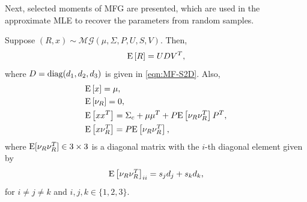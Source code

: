 Next, selected moments of MFG are presented, which are used in the approximate MLE to recover the parameters from random samples.
\begin{theorem} \label{thm:MFG-moment}
	Suppose $(R,x)\sim\mathcal{MG}(\mu,\allowbreak \Sigma,\allowbreak P,\allowbreak U,\allowbreak S,\allowbreak V)$.
	Then,
	\begin{equation} \label{eqn:MFG-ER}
		\mathrm{E}\left[ R \right] = UDV^T,
	\end{equation}
	where $ D =\mathrm{diag}(d_1,d_2,d_3)$ is given in \eqref{eqn:MF-S2D}.
	Also,
	\begin{align}
		&\mathrm{E}\left[ x \right] = \mu, \label{eqn:MFG-Ex} \\
		&\mathrm{E}\left[ \nu_R \right] = 0, \label{eqn:MFG-EvR} \\
		&\mathrm{E}\left[ xx^T \right] = \Sigma_c+\mu\mu^T+P\mathrm{E}\left[ \nu_R\nu_R^T \right]P^T, \label{eqn:MFG-Exx} \\
		&\mathrm{E}\left[ x\nu_R^T \right] = P\mathrm{E}\left[ \nu_R\nu_R^T \right] \label{eqn:MFG-ExvR},
	\end{align}
	where $\mathrm{E}[\nu_R\nu_R^T]\in\real{3\times3}$ is a diagonal matrix with the $i$-th diagonal element given by
	\begin{equation} \label{eqn:MFG-EvRvR}
		\mathrm{E}\left[ \nu_R\nu_R^T \right]_{ii} = s_jd_j+s_kd_k,
	\end{equation}
	for $i\neq j\neq k$ and $i,j,k\in\{1,2,3\}$.
\end{theorem}
